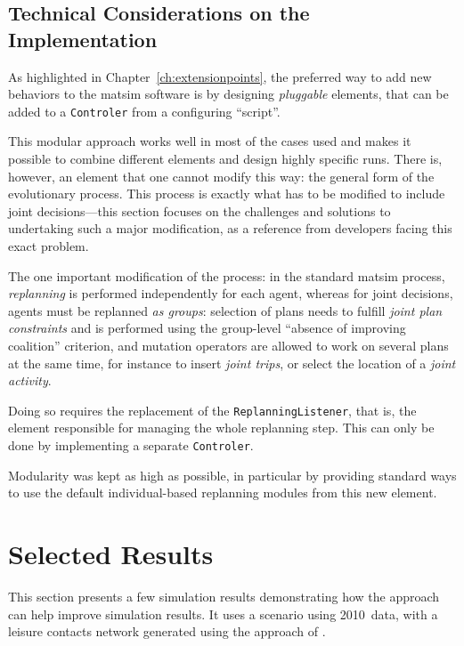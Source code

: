 {%
\subsection{Technical Considerations on the Implementation}
As highlighted in Chapter~\ref{ch:extensionpoints}, the preferred way to add new behaviors to the \gls{matsim} software is by designing \emph{pluggable} elements, that can be added to a \lstinline|Controler| from a configuring ``script''.

This modular approach works well in most of the cases used and makes it possible to combine different elements and design highly specific runs. There is, however, an element that one cannot modify this way: the general form of the evolutionary process. This process is exactly what has to be modified to include joint decisions---this section focuses on the challenges and solutions to undertaking such a major modification, as a reference from developers facing this exact problem.

The one important modification of the process: in the standard \gls{matsim} process, \emph{replanning} is performed independently for each agent, whereas for joint decisions, agents must be replanned \emph{as groups}: selection of plans needs to fulfill \emph{joint plan constraints} and is performed using the group-level ``absence of improving coalition'' criterion, and mutation operators are allowed to work on several plans at the same time, for instance to insert \emph{joint trips}, or select the location of a \emph{joint activity}.

Doing so requires the replacement of the \lstinline|ReplanningListener|, that is, the element responsible for managing the whole replanning step. This can only be done by implementing a separate \lstinline|Controler|. 

Modularity was kept as high as possible, in particular by providing standard ways to use the default individual-based replanning modules from this new element.

\section{Selected Results}
\label{sec:td:results}
This section presents a few simulation results demonstrating how the approach can help improve simulation results. It uses a scenario using 2010~data, with a leisure contacts network generated using the approach of \citet{ArentzeEtAl_SN_2013}.

}
